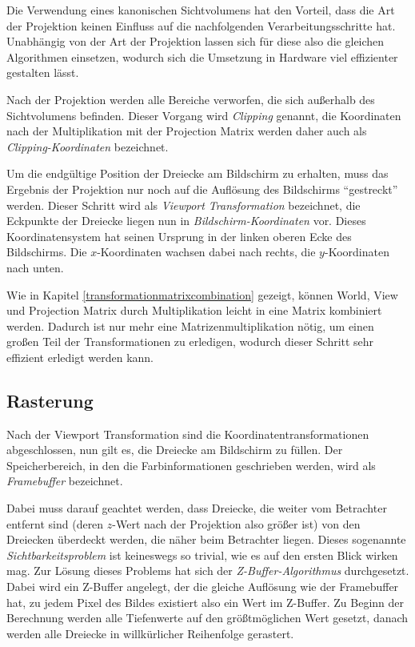 Die Verwendung eines kanonischen Sichtvolumens hat den Vorteil, dass die Art der Projektion keinen Einfluss auf die nachfolgenden Verarbeitungsschritte hat. Unabhängig von der Art der Projektion lassen sich für diese also die gleichen Algorithmen einsetzen, wodurch sich die Umsetzung in Hardware viel effizienter gestalten lässt.

Nach der Projektion werden alle Bereiche verworfen, die sich außerhalb des Sichtvolumens befinden. Dieser Vorgang wird \emph{Clipping} genannt, die Koordinaten nach der Multiplikation mit der Projection Matrix werden daher auch als \emph{Clipping-Koordinaten} bezeichnet.

Um die endgültige Position der Dreiecke am Bildschirm zu erhalten, muss das Ergebnis der Projektion nur noch auf die Auflösung des Bildschirms \enquote{gestreckt} werden. Dieser Schritt wird als \emph{Viewport Transformation} bezeichnet, die Eckpunkte der Dreiecke liegen nun in \emph{Bildschirm-Koordinaten} vor. Dieses Koordinatensystem hat seinen Ursprung in der linken oberen Ecke des Bildschirms. Die $x$-Koordinaten wachsen dabei nach rechts, die $y$-Koordinaten nach unten.

Wie in Kapitel \ref{transformationmatrixcombination} gezeigt, können World, View und Projection Matrix durch Multiplikation leicht in eine Matrix kombiniert werden. Dadurch ist nur mehr eine Matrizenmultiplikation nötig, um einen großen Teil der Transformationen zu erledigen, wodurch dieser Schritt sehr effizient erledigt werden kann.

\subsection{Rasterung}
Nach der Viewport Transformation sind die Koordinatentransformationen abgeschlossen, nun gilt es, die Dreiecke am Bildschirm zu füllen. Der Speicherbereich, in den die Farbinformationen geschrieben werden, wird als \emph{Framebuffer} bezeichnet.

Dabei muss darauf geachtet werden, dass Dreiecke, die weiter vom Betrachter entfernt sind (deren $z$-Wert nach der Projektion also größer ist) von den Dreiecken überdeckt werden, die näher beim Betrachter liegen. Dieses sogenannte \emph{Sichtbarkeitsproblem} ist keineswegs so trivial, wie es auf den ersten Blick wirken mag. Zur Lösung dieses Problems hat sich der \emph{Z-Buffer-Algorithmus} durchgesetzt. Dabei wird ein Z-Buffer angelegt, der die gleiche Auflösung wie der Framebuffer hat, zu jedem Pixel des Bildes existiert also ein Wert im Z-Buffer. Zu Beginn der Berechnung werden alle Tiefenwerte auf den größtmöglichen Wert gesetzt, danach werden alle Dreiecke in willkürlicher Reihenfolge gerastert.

